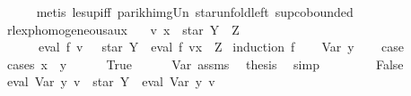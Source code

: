 \begin{isabellebody}
\ \ \ \ \isamarkupfalse%
\ {\isacharparenleft}{\kern0pt}metis\ le{\isacharunderscore}{\kern0pt}sup{\isacharunderscore}{\kern0pt}iff\ parikh{\isacharunderscore}{\kern0pt}img{\isacharunderscore}{\kern0pt}Un\ star{\isacharunderscore}{\kern0pt}unfold{\isacharunderscore}{\kern0pt}left\ sup{\isachardot}{\kern0pt}cobounded{}{\isacharparenright}{\kern0pt}\isanewline
{}\isamarkupfalse%
%
\endisatagproof
{\isafoldproof}%
%
\isadelimproof
%
\endisadelimproof
%
\isadelimdocument
%
\endisadelimdocument
%
\isatagdocument
%
\isamarkuptrue%
%
\endisatagdocument
{\isafolddocument}%
%
\isadelimdocument
%
\endisadelimdocument
{}\isamarkupfalse%
\ rlexp{\isacharunderscore}{\kern0pt}homogeneous{\isacharunderscore}{\kern0pt}aux{\isacharcolon}{\kern0pt}\isanewline
\ \ \ {\isachardoublequoteopen}v\ x\ {\isacharequal}{\kern0pt}\ star\ Y\ {\isacharat}{\kern0pt}{\isacharat}{\kern0pt}\ Z{\isachardoublequoteclose}\isanewline
\ \ \ \ \ {\isachardoublequoteopen}{\isasymPsi}\ {\isacharparenleft}{\kern0pt}eval\ f\ v{\isacharparenright}{\kern0pt}\ {\isasymsubseteq}\ {\isasymPsi}\ {\isacharparenleft}{\kern0pt}star\ Y\ {\isacharat}{\kern0pt}{\isacharat}{\kern0pt}\ eval\ f\ {\isacharparenleft}{\kern0pt}v{\isacharparenleft}{\kern0pt}x\ {\isacharcolon}{\kern0pt}{\isacharequal}{\kern0pt}\ Z{\isacharparenright}{\kern0pt}{\isacharparenright}{\kern0pt}{\isacharparenright}{\kern0pt}{\isachardoublequoteclose}\isanewline
%
\isadelimproof
%
\endisadelimproof
%
\isatagproof
{}\isamarkupfalse%
\ {\isacharparenleft}{\kern0pt}induction\ f{\isacharparenright}{\kern0pt}\isanewline
\ \ \isamarkupfalse%
\ {\isacharparenleft}{\kern0pt}Var\ y{\isacharparenright}{\kern0pt}\isanewline
\ \ \isamarkupfalse%
\ {\isacharquery}{\kern0pt}case\isanewline
\ \ \isamarkupfalse%
\ {\isacharparenleft}{\kern0pt}cases\ {\isachardoublequoteopen}x\ {\isacharequal}{\kern0pt}\ y{\isachardoublequoteclose}{\isacharparenright}{\kern0pt}\isanewline
\ \ \ \ \isamarkupfalse%
\ True\isanewline
\ \ \ \ \isamarkupfalse%
\ Var\ assms\ \isamarkupfalse%
\ {\isacharquery}{\kern0pt}thesis\ \isamarkupfalse%
\ simp\isanewline
\ \ \isamarkupfalse%
\isanewline
\ \ \ \ \isamarkupfalse%
\ False\isanewline
\ \ \ \ \isamarkupfalse%
\ {\isachardoublequoteopen}eval\ {\isacharparenleft}{\kern0pt}Var\ y{\isacharparenright}{\kern0pt}\ v\ {\isasymsubseteq}\ star\ Y\ {\isacharat}{\kern0pt}{\isacharat}{\kern0pt}\ eval\ {\isacharparenleft}{\kern0pt}Var\ y{\isacharparenright}{\kern0pt}\ v{\isachardoublequoteclose}\ \isamarkupfalse%

\end{isabellebody}
